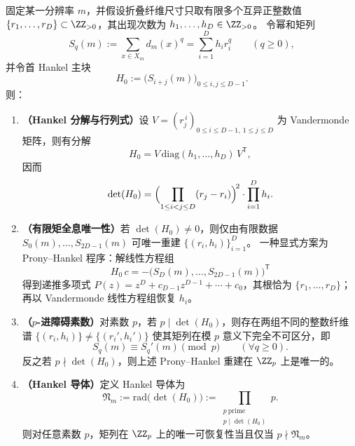 \begin{corollary}\label{cor:xi-fiber-spectrum-hankel-conductor-prony-padic}
固定某一分辨率 \(m\)，并假设折叠纤维尺寸只取有限多个互异正整数值
\(\{r_1,\dots,r_D\}\subset\ZZ_{>0}\)，其出现次数为 \(h_1,\dots,h_D\in\ZZ_{>0}\)。
令幂和矩列
\[
S_q(m):=\sum_{x\in X_m} d_m(x)^q=\sum_{i=1}^{D}h_i r_i^{q}\qquad(q\ge 0),
\]
并令首 Hankel 主块
\[
H_0:=\bigl(S_{i+j}(m)\bigr)_{0\le i,j\le D-1}.
\]
则：
\begin{enumerate}
  \item \textbf{（Hankel 分解与行列式）}设 \(V=(r_j^{\,i})_{0\le i\le D-1,\ 1\le j\le D}\) 为 Vandermonde 矩阵，则有分解
  \[
  H_0=V\,\mathrm{diag}(h_1,\dots,h_D)\,V^{\mathsf T},
  \]
  因而
  \[
  \det(H_0)=\Bigl(\prod_{1\le i<j\le D}(r_j-r_i)\Bigr)^{\!2}\cdot\prod_{i=1}^{D}h_i.
  \]
  \item \textbf{（有限矩全息唯一性）}若 \(\det(H_0)\neq 0\)，则仅由有限数据 \(S_0(m),\dots,S_{2D-1}(m)\) 可唯一重建 \(\{(r_i,h_i)\}_{i=1}^{D}\)。
  一种显式方案为 Prony--Hankel 程序：解线性方程组
  \[
  H_0\,c=-\bigl(S_D(m),\dots,S_{2D-1}(m)\bigr)^{\mathsf T}
  \]
  得到递推多项式
  \(
  P(z)=z^D+c_{D-1}z^{D-1}+\cdots+c_0
  \)，其根恰为 \(\{r_1,\dots,r_D\}\)；
  再以 Vandermonde 线性方程组恢复 \(h_i\)。
  \item \textbf{（\(p\)-进障碍素数）}对素数 \(p\)，若 \(p\mid \det(H_0)\)，则存在两组不同的整数纤维谱 \(\{(r_i,h_i)\}\neq\{(r_i',h_i')\}\) 使其矩列在模 \(p\) 意义下完全不可区分，即
  \[
  S_q(m)\equiv S_q'(m)\pmod p\qquad(\forall q\ge 0).
  \]
  反之若 \(p\nmid\det(H_0)\)，则上述 Prony--Hankel 重建在 \(\ZZ_p\) 上是唯一的。
  \item \textbf{（Hankel 导体）}定义 Hankel 导体为
  \[
  \mathfrak N_m:=\mathrm{rad}\bigl(\det(H_0)\bigr)
  :=\prod_{\substack{p\ \mathrm{prime}\\ p\mid \det(H_0)}} p.
  \]
  则对任意素数 \(p\)，矩列在 \(\ZZ_p\) 上的唯一可恢复性当且仅当 \(p\nmid \mathfrak N_m\)。
\end{enumerate}
\end{corollary}
